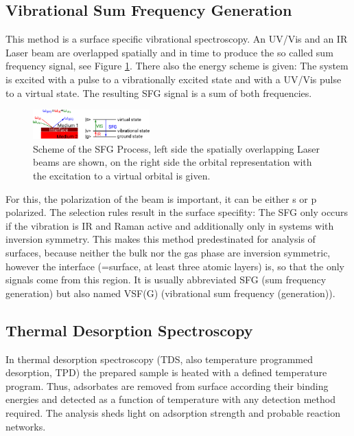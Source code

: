 \documentclass[11pt,DIV=13,BCOR=5mm,a4paper,headinclude]{scrbook}
\begin{document}
\subsection{Vibrational Sum Frequency Generation}
This method is a surface specific vibrational spectroscopy.
An UV/Vis and an IR Laser beam are overlapped spatially and in time to produce the so called sum frequency signal, see Figure \ref{abb:sfg_scheme}.
There also the energy scheme is given: The system is excited with a pulse to a vibrationally excited state and with a UV/Vis pulse to a virtual state.
The resulting SFG signal is a sum of both frequencies.
\begin{figure}[!h]
\centering
 \includegraphics[width=0.4\textwidth]{figures/theory/sfg-scheme.pdf}
   \caption{Scheme of the SFG Process, left side the spatially overlapping Laser beams are shown, on the right side the orbital representation with the excitation to a virtual orbital is given.}
            \label{abb:sfg_scheme}
\end{figure}
For this, the polarization of the beam is important, it can be either s or p polarized.
The selection rules result in the surface specifity: The SFG only occurs if the vibration is IR and Raman active and additionally only in systems with inversion symmetry.
This makes this method predestinated for analysis of surfaces, because neither the bulk nor the gas phase are inversion symmetric, however the interface (=surface, at least three atomic layers) is, so that the only signals come from this region.
It is usually abbreviated SFG (sum frequency generation) but also named VSF(G) (vibrational sum frequency (generation)).
 
\subsection{Thermal Desorption Spectroscopy}
In thermal desorption spectroscopy (TDS, also temperature programmed desorption, TPD) the prepared sample is heated with a defined temperature program.
Thus, adsorbates are removed from surface according their binding energies and detected as a function of temperature with any detection method required.
The analysis sheds light on adsorption strength and probable reaction networks.
\end{document}
